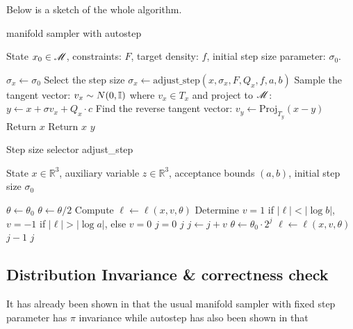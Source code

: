 \documentclass{article}
\begin{document}
Below is a sketch of the whole algorithm.
\begin{algorithm}[H]
\caption{manifold sampler with autostep}
\label{algo:manifold_autostep}
\begin{algorithmic}[1]
    \Require State $x_0 \in \mathscr{M}$, constraints: $F$, target density: $f$, initial step size parameter: $\sigma_0$. 

    \State $\sigma_x \gets \sigma_0$
    \State Select the step size $\sigma_x \gets \text{adjust\_step}(x, \sigma_x, F, Q_x, f, a, b)$
    \State Sample the tangent vector: $v_x \sim N(0, \mathbb I)$ where $v_x \in T_x$ and project to $\mathscr{M}$: $y \gets x + \sigma v_x + Q_x\cdot c$
    \State Find the reverse tangent vector: $v_y \gets \text{Proj}_{T_y}(x-y)$
      
        \State Return $x$
    \EndIf
     
        \State Return $x$
    \EndIf
    \State \Return $y$
    \end{algorithmic}
\end{algorithm}


\begin{algorithm}[H]
\caption{Step size selector adjust\_step}
\label{algo:stepsize_selector}
\begin{algorithmic}[1]
\Require State $x \in \mathbb{R}^3$, auxiliary variable $z \in \mathbb{R}^3$, acceptance bounds $(a, b)$, initial step size $\sigma_0$

\State $\theta \gets \theta_0$
    \State $\theta \gets \theta / 2$    
\EndWhile
\State Compute $\ell \gets \ell(x, v, \theta)$
\State Determine $v = 1$ if $|\ell| < |\log b|$, $v = -1$ if $|\ell| > |\log a|$, else $v = 0$
\State $j = 0$
    \State \Return $j$
\EndIf
{}
    \State $j \gets j + v$
    \State $\theta \gets \theta_0 \cdot 2^j$
    \State $\ell \gets \ell(x, v, \theta)$
        \State \Return $j - 1$
        \State \Return $j$
    \EndIf
\EndWhile
\end{algorithmic}
\end{algorithm}


\subsection{Distribution Invariance \& correctness check}
It has already been shown in \cite{manifoldparent} that the usual manifold sampler with fixed step parameter has $\pi$ invariance while autostep has also been shown in \cite{autostep} that
\end{document}
